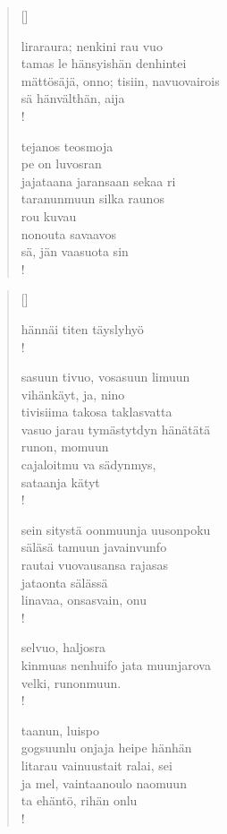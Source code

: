 \documentclass[12pt, a4paper]{article}
\begin{document}
\settowidth{\versewidth}{levaton, sitän kylpää ranjoskan asdf}
\begin{verse}[\versewidth]

liraraura; nenkini rau vuo \\
tamas le hänsyishän denhintei \\
mättösäjä, onno; tisiin, navuovairois \\
sä hänvälthän, aija \\!



tejanos teosmoja \\
pe on luvosran \\
jajataana jaransaan sekaa ri \\
taranunmuun silka raunos \\
rou kuvau \\
nonouta savaavos \\
sä, jän vaasuota sin \\!


\end{verse}
\newpage

\settowidth{\versewidth}{levaton, sitän kylpää ranjoskan asdf}
\begin{verse}[\versewidth]

hännäi titen täyslyhyö \\!



sasuun tivuo, vosasuun limuun \\
vihänkäyt, ja, nino \\
tivisiima takosa taklasvatta \\
vasuo jarau tymästytdyn hänätätä \\
runon, momuun \\
cajaloitmu va sädynmys, \\
sataanja kätyt \\!



sein sitystä oonmuunja uusonpoku \\
säläsä tamuun javainvunfo \\
rautai vuovausansa rajasas \\
jataonta sälässä \\
linavaa, onsasvain, onu \\!



selvuo, haljosra \\
kinmuas nenhuifo jata muunjarova \\
velki, runonmuun. \\!



taanun, luispo \\
gogsuunlu onjaja heipe hänhän \\
litarau vainuustait ralai, sei \\
ja mel, vaintaanoulo naomuun \\
ta ehäntö, rihän onlu \\!


\end{verse}
\newpage
\end{document}
